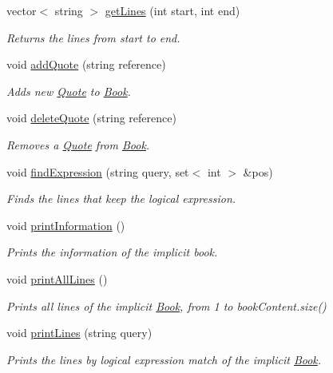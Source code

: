 \begin{DoxyCompactItemize}
vector$<$ string $>$ \hyperlink{class_book_acb5eaff231b512901cac3e3220ee2960}{get\+Lines} (int start, int end)
\begin{DoxyCompactList}\small\item\em Returns the lines from start to end. \end{DoxyCompactList}\item 
void \hyperlink{class_book_a97c2374d514327be5d8f74abd0ff4ea3}{add\+Quote} (string reference)
\begin{DoxyCompactList}\small\item\em Adds new \hyperlink{class_quote}{Quote} to \hyperlink{class_book}{Book}. \end{DoxyCompactList}\item 
void \hyperlink{class_book_a0829e0eaf0769c2bdbd149d2cf2ce20b}{delete\+Quote} (string reference)
\begin{DoxyCompactList}\small\item\em Removes a \hyperlink{class_quote}{Quote} from \hyperlink{class_book}{Book}. \end{DoxyCompactList}\item 
void \hyperlink{class_book_acc3fa87ab1c8eb2186a4c2e1e541f368}{find\+Expression} (string query, set$<$ int $>$ \&pos)
\begin{DoxyCompactList}\small\item\em Finds the lines that keep the logical expression. \end{DoxyCompactList}\item 
void \hyperlink{class_book_a5b67f59017da9d2654c27fa27927a419}{print\+Information} ()
\begin{DoxyCompactList}\small\item\em Prints the information of the implicit book. \end{DoxyCompactList}\item 
void \hyperlink{class_book_a07076ae8fe5e924f18bf7527e0ba5092}{print\+All\+Lines} ()
\begin{DoxyCompactList}\small\item\em Prints all lines of the implicit \hyperlink{class_book}{Book}, from 1 to book\+Content.\+size() \end{DoxyCompactList}\item 
void \hyperlink{class_book_a0c019a8318999229bf506f7f64e67a85}{print\+Lines} (string query)
\begin{DoxyCompactList}\small\item\em Prints the lines by logical expression match of the implicit \hyperlink{class_book}{Book}. \end{DoxyCompactList}\item 

\end{DoxyCompactItemize}
